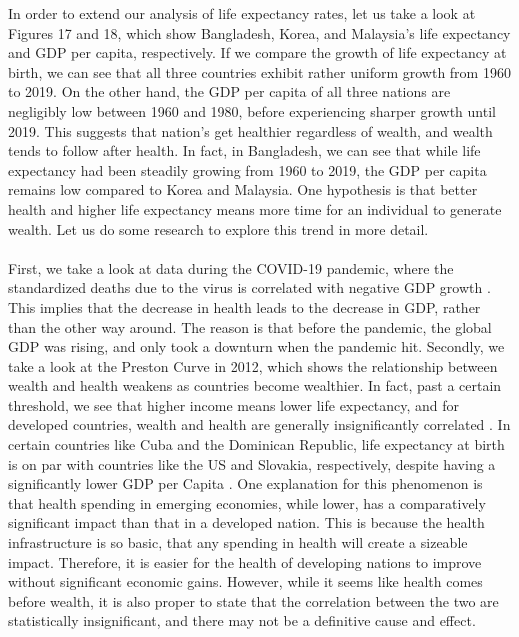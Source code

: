 \documentclass[15pt]{article}
\begin{document}
In order to extend our analysis of life expectancy rates, let us take a look at Figures 17 and 18, which show Bangladesh, Korea, and Malaysia's life expectancy and GDP per capita, respectively. If we compare the growth of life expectancy  at birth, we can see that all three countries exhibit rather uniform growth from 1960 to 2019. On the other hand, the GDP per capita of all three nations are negligibly low between 1960 and 1980, before experiencing sharper growth until 2019. This suggests that nation's get healthier regardless of wealth, and wealth tends to follow after health. In fact, in Bangladesh, we can see that while life expectancy had been steadily growing from 1960 to 2019, the GDP per capita remains low compared to Korea and Malaysia. One hypothesis is that better health and higher life expectancy means more time for an individual to generate wealth. Let us do some research to explore this trend in more detail.\\
\\
First, we take a look at data during the COVID-19 pandemic, where the standardized deaths due to the virus is correlated with negative GDP growth \cite{14}. This implies that the decrease in health leads to the decrease in GDP, rather than the other way around. The reason is that before the pandemic, the global GDP was rising, and only took a downturn when the pandemic hit. Secondly, we take a look at the Preston Curve in 2012, which shows the relationship between wealth and health weakens as countries become wealthier. In fact, past a certain threshold, we see that higher income means lower life expectancy, and for developed countries, wealth and health are generally insignificantly correlated \cite{15}. In certain countries like Cuba and the Dominican Republic, life expectancy at birth is on par with countries like the US and Slovakia, respectively, despite having a significantly lower GDP per Capita \cite{15}. One explanation for this phenomenon is that health spending in emerging economies, while lower, has a comparatively significant impact than that in a developed nation. This is because the health infrastructure is so basic, that any spending in health will create a sizeable impact. Therefore, it is easier for the health of developing nations to improve without significant economic gains. However, while it seems like health comes before wealth, it is also proper to state that the correlation between the two are statistically insignificant, and there may not be a definitive cause and effect.\\
\\
\end{document}
